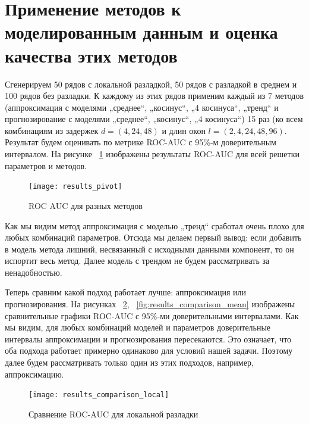 \documentclass[%
12pt,
master,  %
natbib,      %
subf,        %
substylefile = spbu.rtx,
href,        %
colorlinks,  %
]{disser}
\begin{document}


\section{Применение методов к моделированным данным и оценка качества этих методов}

Сгенерируем 50 рядов с локальной разладкой, 50 рядов с разладкой в среднем и 100 рядов без разладки. К каждому из этих рядов применим каждый из 7 методов (аппроксимация с моделями „среднее“, „косинус“, „4 косинуса“, „тренд“ и прогнозирование с моделями  „среднее“, „косинус“, „4 косинуса“) 15 раз (ко всем комбинациям из задержек $d = (4,24,48)$ и длин окон $l = (2,4,24,48,96)$. Результат будем оценивать по метрике ROC-AUC с 95\%-м доверительным интервалом. На рисунке ~\ref{fig:results_pivot} изображены результаты ROC-AUC для всей решетки параметров и методов.

\begin{figure}[!hhh]
	\begin{center}
		\texttt{[image: results\_pivot]}
	\end{center}
	\vspace{-5mm}\caption{ROC AUC для разных методов}
	\label{fig:results_pivot}
\end{figure}

Как мы видим метод аппроксимация с моделью „тренд“ сработал очень плохо для любых комбинаций параметров. Отсюда мы делаем первый вывод: если добавить в модель метода лишний, несвязанный с исходными данными компонент, то он испортит весь метод. Далее модель с трендом не будем рассматривать за ненадобностью.

Теперь сравним какой подход работает лучше: аппроксимация или прогнозирования. На рисунках ~\ref{fig:results_comparison_local}, ~\ref{fig:results_comparison_mean} изображены сравнительные графики ROC-AUC с 95\%-ми доверительными интервалами. Как мы видим, для любых комбинаций моделей и параметров доверительные интервалы аппроксимации и прогнозирования пересекаются. Это означает, что оба подхода работает примерно одинаково для условий нашей задачи. Поэтому далее будем рассматривать только один из этих подходов, например, аппроксимацию.

\begin{figure}[!hhh]
	\begin{center}
		\texttt{[image: results\_comparison\_local]}
	\end{center}
	\vspace{-5mm}\caption{Сравнение ROC-AUC для локальной разладки}
	\label{fig:results_comparison_local}
\end{figure}
\end{document}
